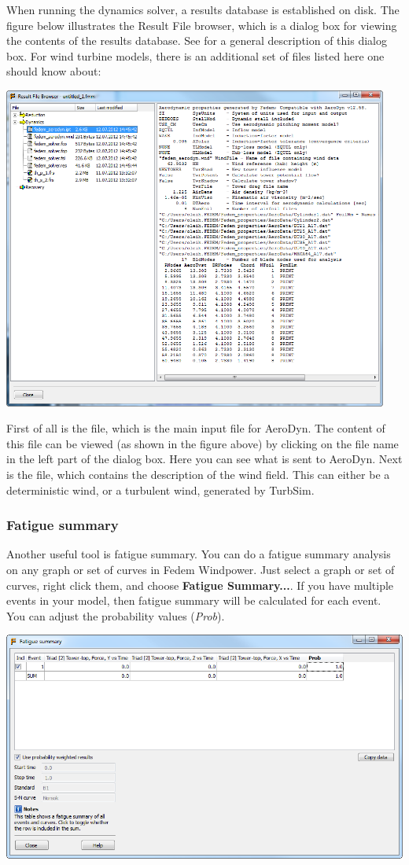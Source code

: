 When running the dynamics solver, a results database is established on disk.
The figure below illustrates the Result File browser, which is a dialog box
for viewing the contents of the results database.
See 
for a general description of this dialog box. For wind turbine models,
there is an additional set of files listed here one should know about:

\includegraphics[width=0.95\textwidth]{Figures/3b-ResultFileBrowser}

First of all is the  file, which is the main input file for AeroDyn.
The content of this file can be viewed (as shown in the figure above) by
clicking on the file name in the left part of the dialog box.
Here you can see what is sent to AeroDyn.
Next is the  file, which contains the description of the wind field.
This can either be a deterministic wind, or a turbulent wind,
generated by TurbSim.

\subsubsection{Fatigue summary}

Another useful tool is fatigue summary. You can do a fatigue summary analysis
on any graph or set of curves in Fedem Windpower.
Just select a graph or set of curves, right click them,
and choose \textbf{Fatigue Summary...}.
If you have multiple events in your model, then fatigue summary will be
calculated for each event. You can adjust the probability values ({\sl Prob}).

\noindent\includegraphics[width=\textwidth]{Figures/3b-GraphsMEF}
